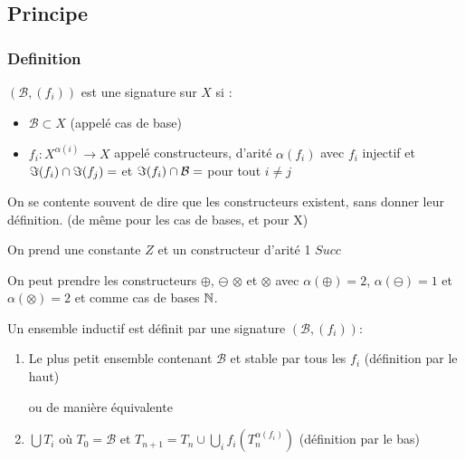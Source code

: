 
\subsection{Principe}
\subsubsection{Definition}

\begin{definition}
	$(\mathcal B, (f_i))$ est une signature sur $X$ si : \begin{itemize}	
	\item $\mathcal B \subset X$ (appelé cas de base)
	
	\item $f_i : X^{\alpha(i)} \to X$ appelé constructeurs, d'arité $\alpha(f_i)$ avec $f_i$ injectif et $\Im(f_i) \cap \Im(f_j) = \empty$ et $\Im(f_i) \cap \mathcal B = \empty$ pour tout $i \neq j$
	\end{itemize}
\end{definition}

\begin{rem}
	On se contente souvent de dire que les constructeurs existent, sans donner leur définition. (de même pour les cas de bases, et pour X) \label{4-3}
\end{rem}

\begin{example}
	\label{4-1}
	On prend une constante $Z$ et un constructeur d'arité 1 $Succ$
\end{example}

\begin{example}
	\label{4-2}
	On peut prendre les constructeurs $\oplus$, $\ominus$ $\otimes$ et $\otimes$ avec $\alpha(\oplus) = 2$, $\alpha(\ominus) = 1$ et $\alpha(\otimes) = 2$ et comme cas de bases $\mathbb{N}$. 
\end{example}

\begin{definition}
	\label{4-4}
	Un ensemble inductif est définit par une signature $(\mathcal B, (f_i))$: \begin{enumerate}
		\item Le plus petit ensemble contenant $\mathcal B$ et stable par tous les $f_i$ (définition par le haut)
		
		ou de manière équivalente
		
		\item $\bigcup T_i$ où $T_0 = \mathcal B$ et $T_{n+1} = T_{n} \cup \bigcup\limits_{i} f_i( T_{n} ^ {\alpha(f_i)})$ (définition par le bas)
	\end{enumerate}
\end{definition}

